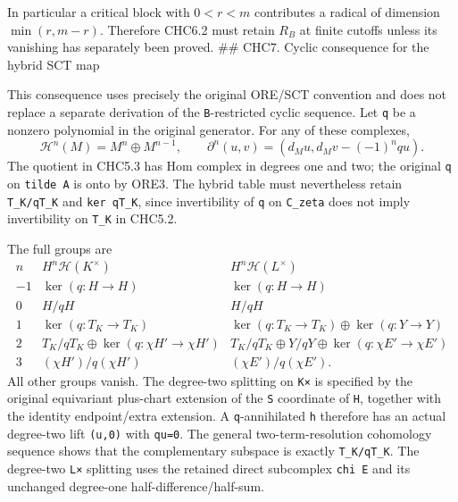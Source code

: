 In particular a critical block with \(0<r<m\) contributes a radical of
dimension \(\min(r,m-r)\). Therefore CHC6.2 must retain \(R_B\) at
finite cutoffs unless its vanishing has separately been proved. \#\#
CHC7. Cyclic consequence for the hybrid SCT map

This consequence uses precisely the original ORE/SCT convention and does
not replace a separate derivation of the \texttt{B}-restricted cyclic
sequence. Let \texttt{q} be a nonzero polynomial in the original
generator. For any of these complexes, \[
\mathscr H^n(M)=M^n\oplus M^{n-1},\qquad
\partial^n(u,v)=(d_Mu,d_Mv-(-1)^nq u).
\tag{CHC7.1}
\] The quotient in CHC5.3 has Hom complex
 in degrees one and two; the
original \texttt{q} on \texttt{tilde\ A} is onto by ORE3. The hybrid
table must nevertheless retain \texttt{T\_K/qT\_K} and
\texttt{ker\ q\textbar{}T\_K}, since invertibility of \texttt{q} on
\texttt{C\_zeta} does not imply invertibility on \texttt{T\_K} in
CHC5.2.

The full groups are \[
\begin{array}{c|cc}
n&H^n\mathscr H(K^\times)&H^n\mathscr H(L^\times)\\\hline
-1&\ker(q:H\to H)&\ker(q:H\to H)\\
0&H/qH&H/qH\\
1&\ker(q:T_K\to T_K)&\ker(q:T_K\to T_K)\oplus\ker(q:Y\to Y)\\
2&T_K/qT_K\oplus\ker(q:\chi H'\to\chi H')
&T_K/qT_K\oplus Y/qY\oplus\ker(q:\chi E'\to\chi E')\\
3&(\chi H')/q(\chi H')&(\chi E')/q(\chi E').
\end{array}
\tag{CHC7.2}
\] All other groups vanish. The degree-two splitting on \texttt{K×} is
specified by the original equivariant plus-chart extension of the
\texttt{S\textquotesingle{}} coordinate of \texttt{H\textquotesingle{}},
together with the identity endpoint/extra extension. A
\texttt{q}-annihilated \texttt{h\textquotesingle{}} therefore has an
actual degree-two lift \texttt{(u,0)} with \texttt{qu=0}. The general
two-term-resolution cohomology sequence shows that the complementary
subspace is exactly \texttt{T\_K/qT\_K}. The degree-two \texttt{L×}
splitting uses the retained direct subcomplex
\texttt{chi\ E\textquotesingle{}} and its unchanged degree-one
half-difference/half-sum.

